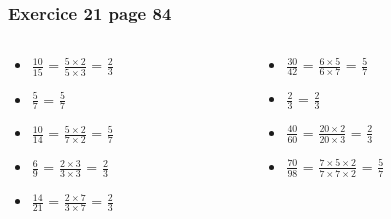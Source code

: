 \documentclass[xcolor={dvipsnames}, handout]{beamer}
\begin{document}
\begin{frame}
	\frametitle{Exercice 21 page 84}
	
	\begin{columns}
		\begin{column}{0.5\textwidth}
			\begin{huge}
				\begin{itemize}
					\setlength\itemsep{1em}
					\item $\frac{10}{15}$ = \pause $\frac{5 \times 2}{5 \times 3}$ = \pause $\frac{2}{3}$\pause
					
					\item $\frac{5}{7}$ = \pause $\frac{5}{7}$\pause
					
					\item $\frac{10}{14}$ = \pause $\frac{5 \times 2}{7 \times 2}$ = \pause $\frac{5}{7}$\pause
					
					\item $\frac{6}{9}$ = \pause $\frac{2 \times 3}{3 \times 3}$ = \pause $\frac{2}{3}$\pause
					
					\item $\frac{14}{21}$ = \pause $\frac{2 \times 7}{3 \times 7}$ = \pause $\frac{2}{3}$\pause
				\end{itemize}	
			\end{huge}
			
		\end{column}
		
		
		\begin{column}{0.5\textwidth}
			\begin{huge}
				\begin{itemize}
					\setlength\itemsep{1em}
					\item $\frac{30}{42}$ = \pause $\frac{6 \times 5}{6 \times 7}$ = \pause $\frac{5}{7}$\pause
					
					\item $\frac{2}{3}$ = \pause $\frac{2}{3}$\pause
					
					\item $\frac{40}{60}$ = \pause $\frac{20 \times 2}{20 \times 3}$ = \pause $\frac{2}{3}$\pause
					
					\item $\frac{70}{98}$ = \pause $\frac{7 \times 5 \times 2}{7 \times 7 \times 2}$ = \pause $\frac{5}{7}$
				\end{itemize}	
			\end{huge}
			
		\end{column}
	\end{columns}		
	
	
\end{frame}
\end{document}
